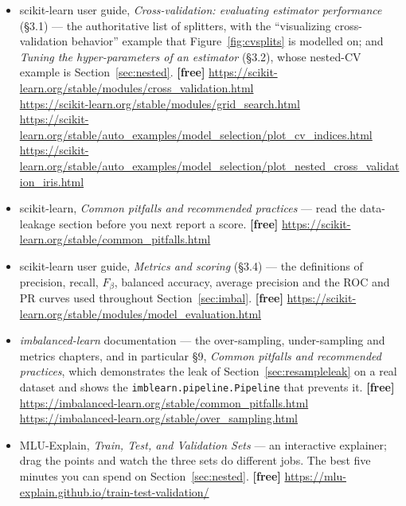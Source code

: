 \documentclass[11pt]{article}
\begin{document}
\begin{itemize}[leftmargin=*]
  \item scikit-learn user guide, \emph{Cross-validation: evaluating estimator
    performance} (\S3.1) --- the authoritative list of splitters, with the
    ``visualizing cross-validation behavior'' example that
    Figure~\ref{fig:cvsplits} is modelled on; and \emph{Tuning the
    hyper-parameters of an estimator} (\S3.2), whose nested-CV example is
    Section~\ref{sec:nested}. \textbf{[free]}
    \url{https://scikit-learn.org/stable/modules/cross_validation.html} \\
    \url{https://scikit-learn.org/stable/modules/grid_search.html} \\
    \url{https://scikit-learn.org/stable/auto_examples/model_selection/plot_cv_indices.html}
    \\
    \url{https://scikit-learn.org/stable/auto_examples/model_selection/plot_nested_cross_validation_iris.html}
  \item scikit-learn, \emph{Common pitfalls and recommended practices} --- read
    the data-leakage section before you next report a score. \textbf{[free]}
    \url{https://scikit-learn.org/stable/common_pitfalls.html}
  \item scikit-learn user guide, \emph{Metrics and scoring} (\S3.4) --- the
    definitions of precision, recall, $F_\beta$, balanced accuracy, average
    precision and the ROC and PR curves used throughout
    Section~\ref{sec:imbal}. \textbf{[free]}
    \url{https://scikit-learn.org/stable/modules/model_evaluation.html}
  \item \emph{imbalanced-learn} documentation --- the over-sampling,
    under-sampling and metrics chapters, and in particular \S9, \emph{Common
    pitfalls and recommended practices}, which demonstrates the leak of
    Section~\ref{sec:resampleleak} on a real dataset and shows the
    \texttt{imblearn.pipeline.Pipeline} that prevents it. \textbf{[free]}
    \url{https://imbalanced-learn.org/stable/common_pitfalls.html} \\
    \url{https://imbalanced-learn.org/stable/over_sampling.html}
  \item MLU-Explain, \emph{Train, Test, and Validation Sets} --- an
    interactive explainer; drag the points and watch the three sets do
    different jobs. The best five minutes you can spend on
    Section~\ref{sec:nested}. \textbf{[free]}
    \url{https://mlu-explain.github.io/train-test-validation/}
\end{itemize}
\end{document}
